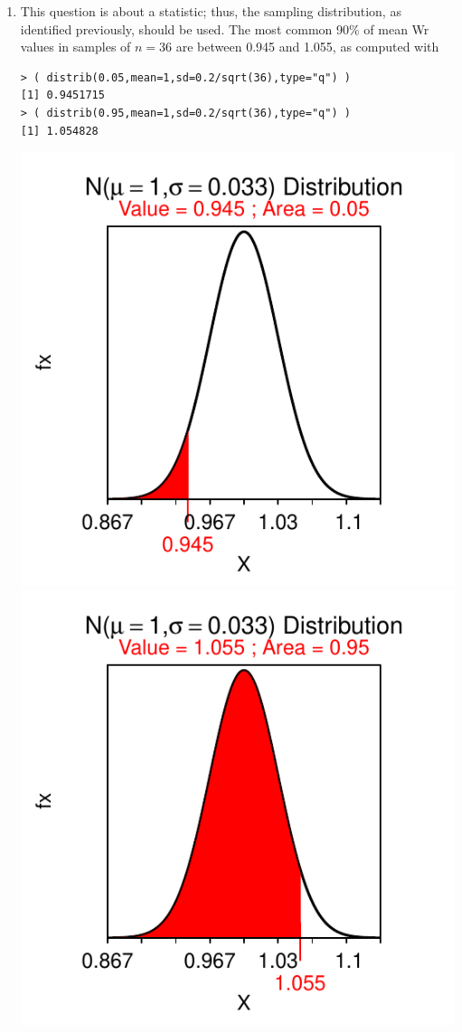 \documentclass[10pt,openany]{book}\usepackage[]{graphicx}\usepackage[]{color}
\makeatletter
\newenvironment{kframe}{%
 \def\at@end@of@kframe{}%
 \ifinner\ifhmode%
  \def\at@end@of@kframe{\end{minipage}}%
  \begin{minipage}{\columnwidth}%
 \fi\fi%
 \def\FrameCommand##1{\hskip\@totalleftmargin \hskip-\fboxsep
 \colorbox{shadecolor}{##1}\hskip-\fboxsep
     \hskip-\linewidth \hskip-\@totalleftmargin \hskip\columnwidth}%
 \MakeFramed {\advance\hsize-\width
   \@totalleftmargin\z@ \linewidth\hsize
   \@setminipage}}%
 {\par\unskip\endMakeFramed%
 \at@end@of@kframe}
\newenvironment{knitrout}{}{} %
\makeatother
\begin{document}
\begin{itemize}
\begin{enumerate}
\begin{knitrout}
{}



\end{knitrout}
       \item This question is about a statistic; thus, the sampling distribution, as identified previously, should be used.   The most common 90\% of mean Wr values in samples of $n=36$ are between 0.945 and 1.055, as computed with
\begin{knitrout}
\color{fgcolor}\begin{kframe}
\begin{verbatim}
> ( distrib(0.05,mean=1,sd=0.2/sqrt(36),type="q") )
[1] 0.9451715
> ( distrib(0.95,mean=1,sd=0.2/sqrt(36),type="q") )
[1] 1.054828
\end{verbatim}
\end{kframe}

{\centering \includegraphics[width=.4\linewidth]{Figs/unnamed-chunk-306-1} 
\includegraphics[width=.4\linewidth]{Figs/unnamed-chunk-306-2} 

}




\end{knitrout}
\end{enumerate}
\end{itemize}
\end{document}
